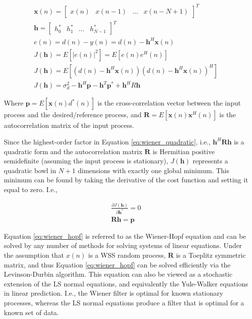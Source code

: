 \begin{eqnarray}
	\boldsymbol{x}(n) = 
	\begin{bmatrix}
		x(n) & x(n-1) & \dots & x(n-N+1)
	\end{bmatrix}^T \\
	\boldsymbol{h} = 
	\begin{bmatrix}
		h_0^* & h_1^* & \dots & h_{N-1}^*
	\end{bmatrix}^T \\
	e(n)=d(n) - y(n) = d(n) - \boldsymbol{h}^H\boldsymbol{x}(n) \\
	J(\boldsymbol{h}) = E\left[ \left| e(n) \right|^2 \right] = E\left[e(n)e^H(n)\right] \\
	J(\boldsymbol{h}) = E\left[
	\left(d(n) - \boldsymbol{h}^H\boldsymbol{x}(n)\right)
	\left(d(n) - \boldsymbol{h}^H\boldsymbol{x}(n)\right)^H
	\right] \label{eq:wiener_cost_fn_0} \\
	J(\boldsymbol{h}) = \sigma_d^2 - \boldsymbol{h}^H\boldsymbol{p} - \boldsymbol{h}^T\boldsymbol{p}^*+\boldsymbol{h}^H R \boldsymbol{h} \label{eq:wiener_quadratic}
\end{eqnarray}

\noindent
Where $\boldsymbol{p} = E \left[ \boldsymbol{x}(n)d^*(n) \right]$ is the cross-correlation vector between the input process and the desired/reference process, and $\boldsymbol{R} = E \left[ \boldsymbol{x}(n)\boldsymbol{x}^H (n) \right]$ is the autocorrelation matrix of the input process.

Since the highest-order factor in Equation \ref{eq:wiener_quadratic}, i.e., $\boldsymbol{h}^H \boldsymbol{R} \boldsymbol{h}$ is a quadratic form and the autocorrelation matrix $\boldsymbol{R}$ is Hermitian positive semidefinite (assuming the input process is stationary), $J(\boldsymbol{h})$ represents a quadratic bowl in $N+1$ dimensions with exactly one global minimum. This minimum can be found by taking the derivative of the cost function and setting it equal to zero. I.e.,


\begin{eqnarray}
	\frac{\partial J(\boldsymbol{h})}{\partial \boldsymbol{h}^*}=0 \\
	\boldsymbol{R} \boldsymbol{h} = \boldsymbol{p} \label{eq:wiener_hopf}
\end{eqnarray}

Equation \ref{eq:wiener_hopf} is referred to as the Wiener-Hopf equation and can be solved by any number of methods for solving systems of linear equations. Under the assumption that $x(n)$ is a WSS random process, $\boldsymbol{R}$ is a Toeplitz symmetric matrix, and thus Equation \ref{eq:wiener_hopf} can be solved efficiently via the Levinson-Durbin algorithm. This equation can also be viewed as a stochastic extension of the LS normal equations, and equivalently the Yule-Walker equations in linear prediction. I.e., the Wiener filter is optimal for known stationary processes, whereas the LS normal equations produce a filter that is optimal for a known set of data. 

